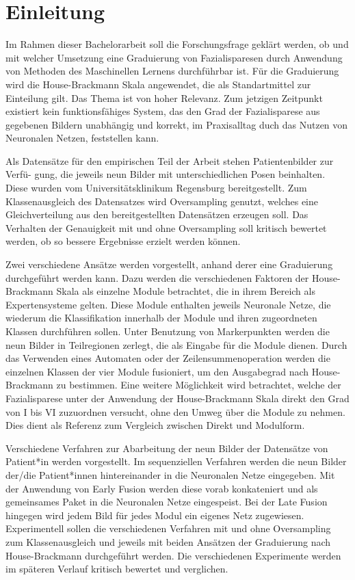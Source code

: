
\chapter{Einleitung}
\label{einleitung}

Im Rahmen dieser Bachelorarbeit soll die Forschungsfrage geklärt werden, ob und mit welcher Umsetzung eine Graduierung von Fazialisparesen durch Anwendung von Methoden des Maschinellen Lernens durchführbar ist. Für die Graduierung wird die House-Brackmann Skala angewendet, die als Standartmittel zur Einteilung gilt. Das Thema ist von hoher Relevanz. Zum jetzigen Zeitpunkt existiert kein funktionsfähiges System, das den Grad der Fazialisparese aus gegebenen Bildern unabhängig und korrekt, im Praxisalltag duch das Nutzen von Neuronalen Netzen, feststellen kann.

Als Datensätze für den empirischen Teil der Arbeit stehen Patientenbilder zur Verfü- gung, die jeweils neun Bilder mit unterschiedlichen Posen beinhalten. Diese wurden vom Universitätsklinikum Regensburg bereitgestellt. Zum Klassenausgleich des Datensatzes wird Oversampling genutzt, welches eine Gleichverteilung aus den bereitgestellten Datensätzen erzeugen soll. Das Verhalten der Genauigkeit mit und ohne Oversampling soll kritisch bewertet werden, ob so bessere Ergebnisse erzielt werden können.

Zwei verschiedene Ansätze werden vorgestellt, anhand derer eine Graduierung durchgeführt werden kann. Dazu werden die verschiedenen Faktoren der House-Brackmann Skala als einzelne Module betrachtet, die in ihrem Bereich als Expertensysteme gelten. Diese Module enthalten jeweils Neuronale Netze, die wiederum die Klassifikation innerhalb der Module und ihren zugeordneten Klassen durchführen sollen. Unter Benutzung von Markerpunkten werden die neun Bilder in Teilregionen zerlegt, die als Eingabe für die Module dienen. Durch das Verwenden eines Automaten oder der Zeilensummenoperation werden die einzelnen Klassen der vier Module fusioniert, um den Ausgabegrad nach House-Brackmann zu bestimmen. Eine weitere Möglichkeit wird betrachtet, welche der Fazialisparese unter der Anwendung der House-Brackmann Skala direkt den Grad von I bis VI zuzuordnen versucht, ohne den Umweg über die Module zu nehmen. Dies dient als Referenz zum Vergleich zwischen Direkt und Modulform.

Verschiedene Verfahren zur Abarbeitung der neun Bilder der Datensätze von Patient*in werden vorgestellt. Im sequenziellen Verfahren werden die neun Bilder der/die Patient*innen hintereinander in die Neuronalen Netze eingegeben. Mit der Anwendung von Early Fusion werden diese vorab konkateniert und als gemeinsames Paket in die Neuronalen Netze eingespeist. Bei der Late Fusion hingegen wird jedem Bild für jedes Modul ein eigenes Netz zugewiesen. Experimentell sollen die verschiedenen Verfahren mit und ohne Oversampling zum Klassenausgleich und jeweils mit beiden Ansätzen der Graduierung nach House-Brackmann durchgeführt werden. Die verschiedenen Experimente werden im späteren Verlauf kritisch bewertet und verglichen.

